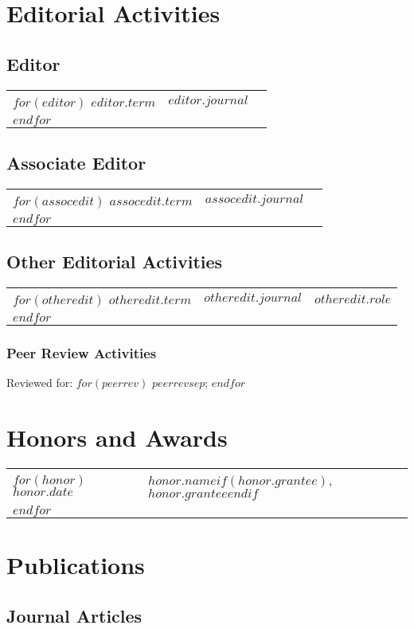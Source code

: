 \documentclass[martgin, line]{article}
\begin{document}
\section*{Editorial Activities}

\subsection*{Editor}
\begin{tabular}{lll}
$for(editor)$
$editor.term$&
$editor.journal$
\\
$endfor$
\end{tabular}


\subsection*{Associate Editor}
\begin{tabular}{lll}
$for(assocedit)$
$assocedit.term$&
$assocedit.journal$
\\
$endfor$
\end{tabular}

\subsection*{Other Editorial Activities}
\begin{tabular}{lll}
$for(otheredit)$
$otheredit.term$&
$otheredit.journal$&
$otheredit.role$
\\
$endfor$
\end{tabular}

\subsubsection*{Peer Review Activities}
Reviewed for:
$for(peerrev)$
$peerrev$$sep$;
$endfor$

\section*{Honors and Awards}
\begin{tabular}{lp{5.5in}}
$for(honor)$
$honor.date$&
$honor.name$$if(honor.grantee)$, $honor.grantee$$endif$
\\
$endfor$
\end{tabular}


\section*{Publications}
\subsection*{Journal Articles}
\end{document}
